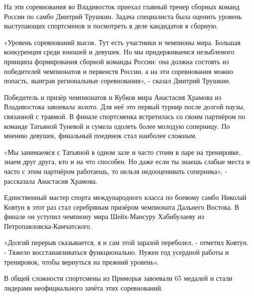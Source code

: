 На эти соревнования во Владивосток приехал главный тренер сборных команд России
по самбо Дмитрий Трушкин. Задача специалиста была оценить уровень выступающих
спортсменов и посмотреть в деле кандидатов в сборную.

«Уровень соревнований высок. Тут есть участники и чемпионы мира. Большая
конкуренция среди юношей и девушек. Но мы придерживаемся незыблемого принципа
формирования сборной команды России: она должна состоять из победителей
чемпионатов и первенств России, а на эти соревнования можно попасть, выиграв
региональные соревнования», - сказал Дмитрий Трушкин.


Победитель и призёр чемпионатов и Кубков мира Анастасия Храмова из Владивостока
завоевала золото. Для неё это первый турнир после долгой паузы, связанной с
травмой. В финале спортсменка встретилась со своим партнёром по команде
Татьяной Туневой и сумела одолеть более молодую соперницу. По мнению девушек,
финальный поединок стал наиболее сложным.

«Мы занимаемся с Татьяной в одном зале и часто стоим в паре на тренировке,
знаем друг друга, кто и на что способен. Но даже если ты знаешь слабые места и
часто с этим партнёром работаешь, то нельзя недооценивать соперника», -
рассказала Анастасия Храмова.

Единственный мастер спорта международного класса по боевому самбо Николай
Ковтун в этот раз стал серебряным призёром чемпионата Дальнего Востока. В
финале он уступил чемпиону мира Шейх-Мансуру Хабибулаеву из
Петропавловска-Камчатского.



«Долгий перерыв сказывается, я и сам этой заразой переболел, - отметил Ковтун.
- Тяжело восстанавливаться функционально. Нужен год усердной работы и
тренировок, чтобы вернуться на прежний уровень».

В общей сложности спортсмены из Приморья завоевали 65 медалей и стали лидерами
неофициального зачёта этих соревнований.

